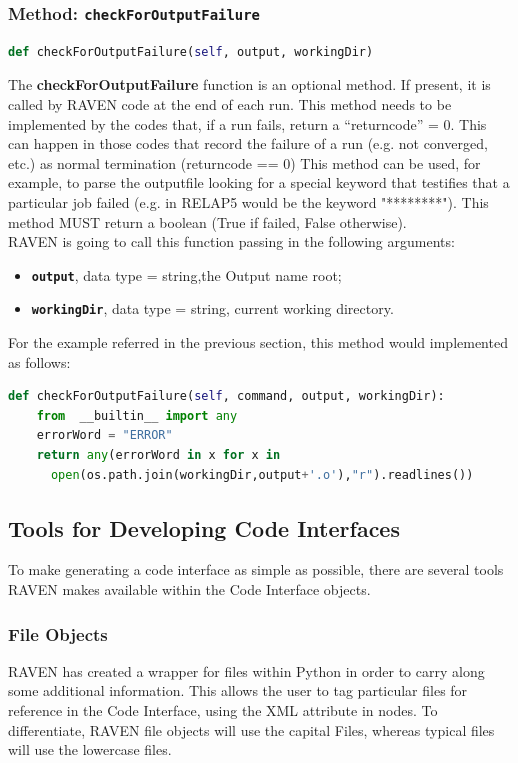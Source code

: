  \subsubsection{Method: \texttt{checkForOutputFailure}}
\label{subsubsec:checkForOutputFailure}
\begin{lstlisting}[language=python]
def checkForOutputFailure(self, output, workingDir)
\end{lstlisting}
The \textbf{checkForOutputFailure} function is an optional method. If present, it is called
by RAVEN code at the end of each run. This method needs to be implemented by the codes that, if a run fails, return a ``returncode'' = 0.
This can happen in those codes that record the failure of a run (e.g. not converged, etc.) as normal termination (returncode == 0)
This method can be used, for example, to parse the outputfile looking for a special keyword that testifies that a particular job  failed
 (e.g. in RELAP5 would be the keyword "********"). This method MUST return a boolean (True if failed, False otherwise).
\\RAVEN is going to call this function passing in the following arguments:
\begin{itemize}
  \item \textbf{\texttt{output}}, data type = string,the Output name root;
  \item  \textbf{\texttt{workingDir}}, data type = string, current working directory.
\end{itemize}
For the example referred in the previous section, this method would implemented as follows:
\newline
\begin{lstlisting}[language=python]
def checkForOutputFailure(self, command, output, workingDir):
    from  __builtin__ import any
    errorWord = "ERROR"
    return any(errorWord in x for x in
      open(os.path.join(workingDir,output+'.o'),"r").readlines())
 \end{lstlisting}

\subsection{Tools for Developing Code Interfaces}
To make generating a code interface as simple as possible, there are several tools RAVEN makes available within the Code Interface objects.

\subsubsection{File Objects}
RAVEN has created a wrapper for files within Python in order to carry along some additional information.  This allows the user to tag particular files for reference in the Code Interface, using the  XML attribute in  nodes.  To differentiate, RAVEN file objects will use the capital Files, whereas typical files will use the lowercase files.

